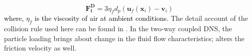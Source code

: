 \documentclass[aip,graphicx]{revtex4-1}
\begin{document}
  \begin{equation}
      \mathbf{F_i^D}=3\eta_f d_p(\mathbf{u}_f(\mathbf{x}_i)-\mathbf{v}_i)
      \label{eq:stokes_drag}
  \end{equation}
  \textcolor{black}{where, $\eta_f$ is the viscosity of air at ambient conditions.} 
  The detail account of the collision rule used here can be found in \citet{ghosh2022statistical}.
  In the two-way coupled DNS, the particle loading brings about change in the fluid flow characteristics; alters the friction velocity as well. 
\end{document}
